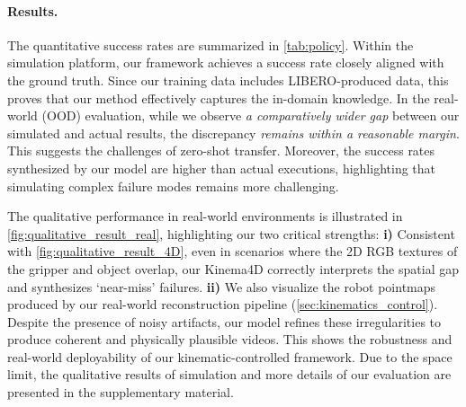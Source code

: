 \paragraph{Results.}
The quantitative success rates are summarized in \cref{tab:policy}. Within the simulation platform, our framework achieves a success rate closely aligned with the ground truth. Since our training data includes LIBERO-produced data, this proves that our method effectively captures the in-domain knowledge. In the real-world (OOD) evaluation, while we observe \textit{a comparatively wider gap} between our simulated and actual results, the discrepancy \textit{remains within a reasonable margin}. This suggests the challenges of zero-shot transfer. Moreover, the success rates synthesized by our model are higher than actual executions, highlighting that simulating complex failure modes remains more challenging. 

The qualitative performance in real-world environments is illustrated in \cref{fig:qualitative_result_real}, highlighting our two critical strengths:
\textbf{i)} Consistent with \cref{fig:qualitative_result_4D}, even in scenarios where the 2D RGB textures of the gripper and object overlap, our Kinema4D correctly interprets the spatial gap and synthesizes `near-miss' failures.
\textbf{ii)} We also visualize the robot pointmaps produced by our real-world reconstruction pipeline (\cref{sec:kinematics_control}). Despite the presence of noisy artifacts, our model refines these irregularities to produce coherent and physically plausible videos. This shows the robustness and real-world deployability of our kinematic-controlled framework.
Due to the space limit, the qualitative results of simulation and more details of our evaluation are presented in the supplementary material.

\begin{table}[t]
\centering
\setlength{\tabcolsep}{6pt}
\caption{Policy evaluation of actual pick\&place under 3 different setups of both simulation platform and real-world (zero-shot OOD) environment. “Ground Truth” denotes the actual execution, “Ours” indicates our simulation, and “Diff” is their difference.}
\vspace{-0.3cm}
\label{tab:policy}
\end{table}

